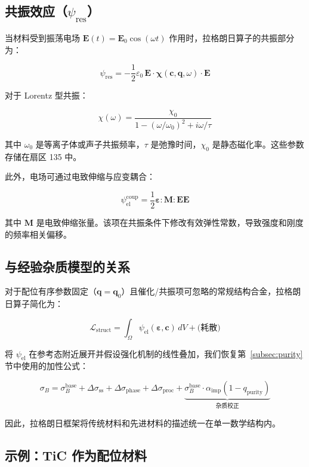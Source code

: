 \documentclass[12pt,a4paper]{article}
\begin{document}
	\subsection{共振效应（\(\psi_{\mathrm{res}}\)）}
	\label{subsec:resonance}
	
	当材料受到振荡电场 \(\mathbf{E}(t) = \mathbf{E}_0 \cos(\omega t)\) 作用时，拉格朗日算子的共振部分为：
	
	\[
	\psi_{\mathrm{res}} = -\frac{1}{2}\varepsilon_0\, \mathbf{E} \cdot \boldsymbol{\chi}(\mathbf{c}, \mathbf{q}, \omega) \cdot \mathbf{E}
	\]
	
	对于 Lorentz 型共振：
	
	\[
	\chi(\omega) = \frac{\chi_0}{1 - (\omega/\omega_0)^2 + i\omega/\tau}
	\]
	
	其中 \(\omega_0\) 是等离子体或声子共振频率，\(\tau\) 是弛豫时间，\(\chi_0\) 是静态磁化率。这些参数存储在扇区 135 中。
	
	此外，电场可通过电致伸缩与应变耦合：
	
	\[
	\psi_{\mathrm{el}}^{\mathrm{coup}} = \frac{1}{2} \boldsymbol{\varepsilon} : \mathbf{M} : \mathbf{E}\mathbf{E}
	\]
	
	其中 \(\mathbf{M}\) 是电致伸缩张量。该项在共振条件下修改有效弹性常数，导致强度和刚度的频率相关偏移。
	
	\subsection{与经验杂质模型的关系}
	\label{subsec:relation-empirical}
	
	对于配位有序参数固定（\(\mathbf{q} = \mathbf{q}_0\)）且催化/共振项可忽略的常规结构合金，拉格朗日算子简化为：
	
	\[
	\mathcal{L}_{\mathrm{struct}} = \int_{\Omega} \psi_{\mathrm{el}}(\boldsymbol{\varepsilon}, \mathbf{c}) \, dV + \text{(耗散)}
	\]
	
	将 \(\psi_{\mathrm{el}}\) 在参考态附近展开并假设强化机制的线性叠加，我们恢复第~\ref{subsec:purity} 节中使用的加性公式：
	
	\[
	\sigma_B = \sigma_B^{\mathrm{base}} + \Delta\sigma_{\mathrm{ss}} + \Delta\sigma_{\mathrm{phase}} + \Delta\sigma_{\mathrm{proc}} + \underbrace{\sigma_B^{\mathrm{base}} \cdot \alpha_{\mathrm{imp}} (1 - q_{\mathrm{purity}})}_{\text{杂质校正}}
	\]
	
	因此，拉格朗日框架将传统材料和先进材料的描述统一在单一数学结构内。
	
	\subsection{示例：TiC 作为配位材料}
	\label{subsec:example-tic}
	
\end{document}
